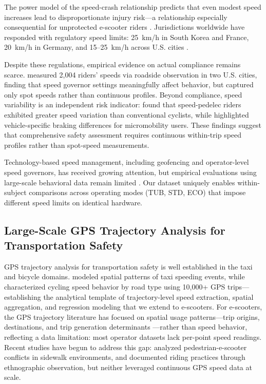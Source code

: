 The power model of the speed-crash relationship \citep{elvik2013reexamination} predicts that even modest speed increases lead to disproportionate injury risk---a relationship especially consequential for unprotected e-scooter riders \citep{yang2020safety}. Jurisdictions worldwide have responded with regulatory speed limits: 25~km/h in South Korea \citep{koreaherald2020escooter} and France, 20~km/h in Germany, and 15--25~km/h across U.S. cities \citep{ma2021municipal, sexton2023shared}.

Despite these regulations, empirical evidence on actual compliance remains scarce. \citet{cicchino2023speed} measured 2,004 riders' speeds via roadside observation in two U.S. cities, finding that speed governor settings meaningfully affect behavior, but captured only spot speeds rather than continuous profiles. Beyond compliance, speed variability is an independent risk indicator: \citet{twisk2021speed} found that speed-pedelec riders exhibited greater speed variation than conventional cyclists, while \citet{vetturi2023kinematic} highlighted vehicle-specific braking differences for micromobility users.%
These findings suggest that comprehensive safety assessment requires continuous within-trip speed profiles rather than spot-speed measurements.

Technology-based speed management, including geofencing \citep{lime2023geofencing, caggiani2023geofencing} and operator-level speed governors, has received growing attention, but empirical evaluations using large-scale behavioral data remain limited \citep{neshagaran2024safety}. Our dataset uniquely enables within-subject comparisons across operating modes (TUB, STD, ECO) that impose different speed limits on identical hardware.

\subsection{Large-Scale GPS Trajectory Analysis for Transportation Safety}
\label{sec:lit_gps}

GPS trajectory analysis for transportation safety is well established in the taxi and bicycle domains. \citet{liu2020taxi} modeled spatial patterns of taxi speeding events, while \citet{strauss2017cycling} characterized cycling speed behavior by road type using 10,000+ GPS trips---establishing the analytical template of trajectory-level speed extraction, spatial aggregation, and regression modeling that we extend to e-scooters. For e-scooters, the GPS trajectory literature has focused on spatial usage patterns---trip origins, destinations, and trip generation determinants \citep{mckenzie2019spatiotemporal, jiao2020shared, bai2020dockless}---rather than speed behavior, reflecting a data limitation: most operator datasets lack per-point speed readings. Recent studies have begun to address this gap: \citet{james2019pedestrians} analyzed pedestrian-e-scooter conflicts in sidewalk environments, and \citet{tuncer2020notes} documented riding practices through ethnographic observation, but neither leveraged continuous GPS speed data at scale.

